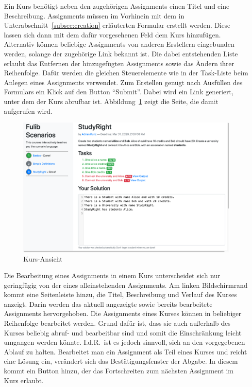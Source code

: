 Ein Kurs benötigt neben den zugehörigen Assignments einen Titel und eine Beschreibung.
Assignments müssen im Vorhinein mit dem in Unterabschnitt~\ref{subsec:creation} erläuterten Formular erstellt werden.
Diese lassen sich dann mit dem dafür vorgesehenen Feld dem Kurs hinzufügen.
Alternativ können beliebige Assignments von anderen Erstellern eingebunden werden, solange der zugehörige Link bekannt ist.
Die dabei entstehenden Liste erlaubt das Entfernen der hinzugefügten Assignments sowie das Ändern ihrer Reihenfolge.
Dafür werden die gleichen Steuerelemente wie in der Task-Liste beim Anlegen eines Assignments verwendet.
Zum Erstellen genügt nach Ausfüllen des Formulars ein Klick auf den Button ``Submit''.
Dabei wird ein Link generiert, unter dem der Kurs abrufbar ist.
Abbildung~\ref{fig:course-view} zeigt die Seite, die damit aufgerufen wird.

\begin{figure}
    \centering
    \includegraphics[width=\textwidth]{chapter/fulib.org/img/course-view.png}
    \caption{Kurs-Ansicht}
    \label{fig:course-view}
\end{figure}

Die Bearbeitung eines Assignments in einem Kurs unterscheidet sich nur geringfügig von der eines alleinstehenden Assignments.
Am linken Bildschirmrand kommt eine Seitenleiste hinzu, die Titel, Beschreibung und Verlauf des Kurses anzeigt.
Darin werden das aktuell angezeigte sowie bereits bearbeitete Assignments hervorgehoben.
Die Assignments eines Kurses können in beliebiger Reihenfolge bearbeitet werden.
Grund dafür ist, dass sie auch außerhalb des Kurses beliebig abruf- und bearbeitbar sind und somit die Einschränkung leicht umgangen werden könnte.
I.d.R.\ ist es jedoch sinnvoll, sich an den vorgegebenen Ablauf zu halten.
Bearbeitet man ein Assignment als Teil eines Kurses und reicht eine Lösung ein, verändert sich das Bestätigungsfenster der Abgabe.
In diesem kommt ein Button hinzu, der das Fortschreiten zum nächsten Assignment im Kurs erlaubt.

